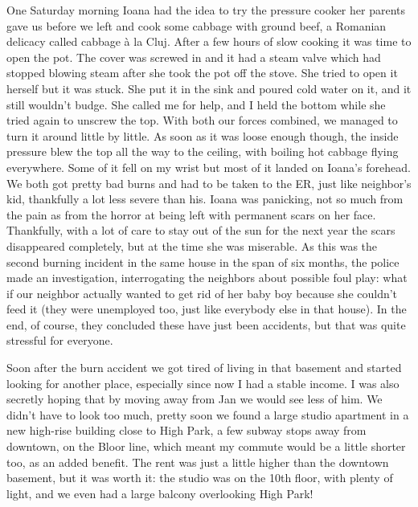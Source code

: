 \documentclass[12pt]{book}
\begin{document}
One Saturday morning Ioana had the idea to try the pressure cooker her
parents gave us before we left and cook some cabbage with ground beef, a
Romanian delicacy called cabbage à la Cluj. After a few hours of slow
cooking it was time to open the pot. The cover was screwed in and it had
a steam valve which had stopped blowing steam after she took the pot off
the stove. She tried to open it herself but it was stuck. She put it in
the sink and poured cold water on it, and it still wouldn't budge. She
called me for help, and I held the bottom while she tried again to
unscrew the top. With both our forces combined, we managed to turn it
around little by little. As soon as it was loose enough though, the
inside pressure blew the top all the way to the ceiling, with boiling
hot cabbage flying everywhere. Some of it fell on my wrist but most of
it landed on Ioana's forehead. We both got pretty bad burns and had to
be taken to the ER, just like neighbor's kid, thankfully a lot less
severe than his. Ioana was panicking, not so much from the pain as from
the horror at being left with permanent scars on her face. Thankfully,
with a lot of care to stay out of the sun for the next year the scars
disappeared completely, but at the time she was miserable. As this was
the second burning incident in the same house in the span of six months,
the police made an investigation, interrogating the neighbors about
possible foul play: what if our neighbor actually wanted to get rid of
her baby boy because she couldn't feed it (they were unemployed too,
just like everybody else in that house). In the end, of course, they
concluded these have just been accidents, but that was quite stressful
for everyone.

Soon after the burn accident we got tired of living in that basement and
started looking for another place, especially since now I had a stable
income. I was also secretly hoping that by moving away from Jan we would
see less of him. We didn't have to look too much, pretty soon we found a
large studio apartment in a new high-rise building close to High Park, a
few subway stops away from downtown, on the Bloor line, which meant my
commute would be a little shorter too, as an added benefit. The rent was
just a little higher than the downtown basement, but it was worth it:
the studio was on the 10th floor, with plenty of light, and we even had
a large balcony overlooking High Park!
\end{document}
